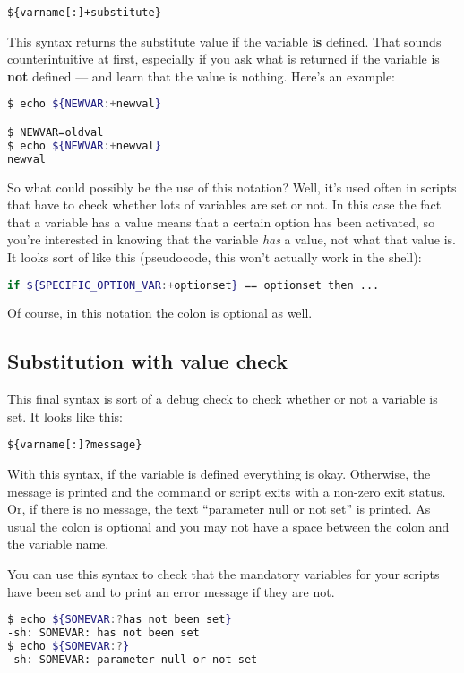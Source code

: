 \scriptsize
\begin{verbatim}
${varname[:]+substitute}
\end{verbatim}
\normalsize

This syntax returns the substitute value if the variable \textbf{is} defined.
That sounds counterintuitive at first, especially if you ask what is returned
if the variable is \textbf{not} defined --- and learn that the value is
nothing. Here's an example:
\lstset{basicstyle=\scriptsize, numbers=left, captionpos=b, tabsize=4}
\begin{lstlisting}[caption=Actual value substitution,language={bash},
breaklines=true,xleftmargin=15pt,label=lst:Actual value substitution]
$ echo ${NEWVAR:+newval}

$ NEWVAR=oldval
$ echo ${NEWVAR:+newval}
newval
\end{lstlisting}

So what could possibly be the use of this notation? Well, it's used often in
scripts that have to check whether lots of variables are set or not. In this
case the fact that a variable has a value means that a certain option has been
activated, so you're interested in knowing that the variable \emph{has} a
value, not what that value is. It looks sort of like this (pseudocode, this
won't actually work in the shell):
\lstset{basicstyle=\scriptsize, numbers=left, captionpos=b, tabsize=4}
\begin{lstlisting}[caption=Default value assignment,language={bash},
breaklines=true,xleftmargin=15pt,label=lst:Default value assignment]
if ${SPECIFIC_OPTION_VAR:+optionset} == optionset then ...
\end{lstlisting}

Of course, in this notation the colon is optional as well.

\subsection{Substitution with value check}
This final syntax is sort of a debug check to check whether or not a variable
is set. It looks like this:
\scriptsize
\begin{verbatim}
${varname[:]?message}
\end{verbatim}
\normalsize

With this syntax, if the variable is defined everything is okay. Otherwise, the
message is printed and the command or script exits with a non-zero exit status.
Or, if there is no message, the text ``parameter null or not set'' is printed.
As usual the colon is optional and you may not have a space between the colon
and the variable name.

You can use this syntax to check that the mandatory variables for your scripts
have been set and to print an error message if they are not.

\lstset{basicstyle=\scriptsize, numbers=left, captionpos=b, tabsize=4}
\begin{lstlisting}[caption=Default value assignment,language={bash},
breaklines=true,xleftmargin=15pt,label=lst:Default value assignment]
$ echo ${SOMEVAR:?has not been set}
-sh: SOMEVAR: has not been set
$ echo ${SOMEVAR:?}
-sh: SOMEVAR: parameter null or not set
\end{lstlisting}
